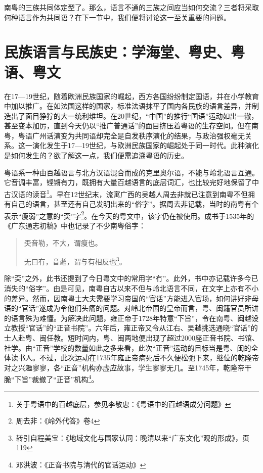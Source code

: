 南粤的三族共同体定型了。那么，语言不通的三族之间应当如何交流？三者将采取何种语言作为共同语？在下一节中，我们便将讨论这一至关重要的问题。

\section{民族语言与民族史：学海堂、粤史、粤语、粤文}

在17—19世纪，随着欧洲民族国家的崛起，西方各国纷纷制定国语，并在小学教育中加以推广。在如法国这样的国家，标准法语抹平了国内各民族的语言差异，并制造出了面目狰狞的大一统利维坦。在20世纪，“中国”的推行“国语”运动如出一辙，甚至变本加厉，直到今天仍以“推广普通话”的面目挤压着粤语的生存空间。但在南粤，粤语广州话演变为共同语却完全是自发秩序演化的结果，与政治强权毫无关系。这一演化发生于17—19世纪，与欧洲民族国家的崛起处于同一时代。此种演化是如何发生的？欲了解这一点，我们便需追溯粤语的历史。

粤语系一种由百越语言与北方汉语混合而成的克里奥尔语，不能与岭北语言互通。它音调丰富，铿锵有力，既拥有大量百越语言的底层词汇，也比较完好地保留了中古汉语的读音\footnote{关于粤语中的百越底层，参见李敬忠：《粤语中的百越语成分问题》}。早在12世纪末，流寓广西的吴越人周去非就已注意到南粤不但拥有自己的语言，甚至还有自己发明出来的“俗字”。据周去非记载，当时的南粤有个表示“瘦弱”之意的“奀”字\footnote{周去非：《岭外代答》卷4}。在今天的粤文中，该字仍在被使用。成书于1535年的《广东通志初稿》中也记录了不少南粤俗字：

\begin{quote}
奀音勒，不大，谓瘦也。

无曰冇，音耄，谓与有相反也\footnote{转引自程美宝：《地域文化与国家认同：晚清以来“广东文化”观的形成》，页119}。
\end{quote}

除“奀”之外，此书还提到了今日粤文中的常用字“冇”。此外，书中亦记载许多今已消失的“俗字”。由是可见，南粤自古以来不但与岭北语言不同，在文字上亦有不小的差异。然而，因南粤士大夫需要学习帝国的“官话”方能进入官场，如何讲好非母语的“官话”遂成为令他们头痛的问题。对岭北帝国的皇帝而言，粤、闽籍官员所讲的语言殊为难懂。为解决此问题，雍正帝于1728年特意“下旨”，令在南粤、闽越设立教授“官话”的“正音书院”。六年后，雍正帝又令从江右、吴越挑选通晓“官话”的士人赴粤、闽任教。短时间内，粤、闽两地便出现了超过2000座正音书院、书馆、社学。由“正音”学校的数量如此之多来看，此次“正音”运动的目标当是粤、闽的全体读书人。不过，此次运动在1735年雍正帝病死后不久便松弛下来，继位的乾隆帝对之兴趣寥寥，各“正音”机构亦虚应故事，学生寥寥无几。至1745年，乾隆帝干脆“下旨”裁撤了“正音”机构\footnote{邓洪波：《正音书院与清代的官话运动》}。


